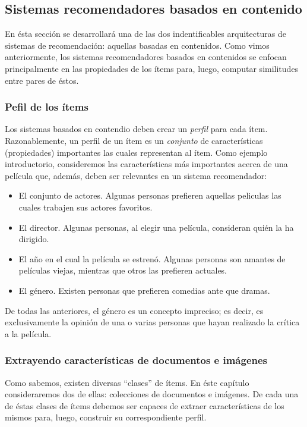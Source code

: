 	\subsection{Sistemas recomendadores basados en contenido}
		
		En ésta sección se desarrollará una de las dos indentificables arquitecturas de sistemas de recomendación: aquellas basadas en contenidos. Como vimos anteriormente, los sistemas recomendadores basados en contenidos se enfocan principalmente en las propiedades de los ítems para, luego, computar similitudes entre pares de éstos.
		
		\subsubsection{Pefil de los ítems}
			Los sistemas basados en contendio deben crear un \textit{perfil} para cada ítem. Razonablemente, un perfil de un ítem es un \textit{conjunto} de características (propiedades) importantes las cuales representan al ítem. Como ejemplo introductorio, consideremos las características más importantes acerca de una película que, además, deben ser relevantes en un sistema recomendador:
			\begin{itemize}
				\item El conjunto de actores. Algunas personas prefieren aquellas peliculas las cuales trabajen sus actores favoritos.
				\item El director. Algunas personas, al elegir una película, consideran quién la ha dirigido.
				\item El año en el cual la película se estrenó. Algunas personas son amantes de películas viejas, mientras que otros las prefieren actuales.
				\item El género. Existen personas que prefieren comedias ante que dramas.
			\end{itemize}
			De todas las anteriores, el género es un concepto impreciso; es decir, es exclusivamente la opinión de una o varias personas que  hayan realizado la crítica a la película.
		
		\subsubsection{Extrayendo características de documentos e imágenes}
			Como sabemos, existen diversas \enquote{clases} de ítems. En éste capítulo consideraremos dos de ellas: colecciones de documentos e imágenes. De cada una de éstas clases de ítems debemos ser capaces de extraer características de los mismos para, luego, construir su correspondiente perfil. \par
			
